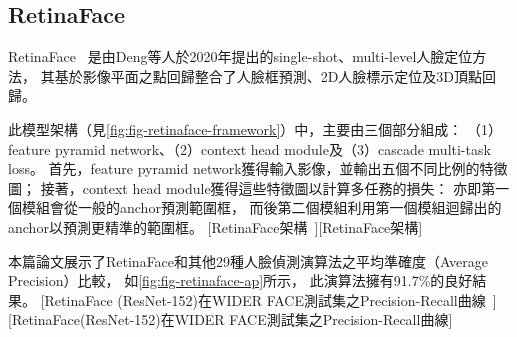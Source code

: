 \documentclass[class=NCU_thesis, crop=false]{standalone}
\begin{document}
\subsection{RetinaFace}
RetinaFace~\cite{deng_retinaface_2020}
是由Deng等人於2020年提出的single-shot、multi-level人臉定位方法，
其基於影像平面之點回歸整合了人臉框預測、2D人臉標示定位及3D頂點回歸。

此模型架構（見\cref{fig:fig-retinaface-framework}）中，主要由三個部分組成：
（1）feature pyramid network、（2）context head module及（3）cascade multi-task loss。
首先，feature pyramid network獲得輸入影像，並輸出五個不同比例的特徵圖；
接著，context head module獲得這些特徵圖以計算多任務的損失：
亦即第一個模組會從一般的anchor預測範圍框，
而後第二個模組利用第一個模組迴歸出的anchor以預測更精準的範圍框。
[RetinaFace架構~\cite{deng_retinaface_2020}][RetinaFace架構]

本篇論文展示了RetinaFace和其他29種人臉偵測演算法之平均準確度（Average Precision）比較，
如\cref{fig:fig-retinaface-ap}所示，
此演算法擁有91.7\%的良好結果。
[RetinaFace (ResNet-152)在WIDER FACE測試集之Precision-Recall曲線~\cite{deng_retinaface_2020}][RetinaFace(ResNet-152)在WIDER FACE測試集之Precision-Recall曲線]
\end{document}
